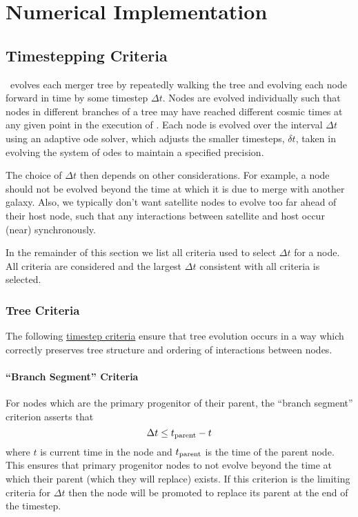 \chapter{Numerical Implementation}

\section{Timestepping Criteria}\label{sec:TimesteppingCriteria}

\glc\ evolves each merger tree by repeatedly walking the tree and evolving each node forward in time by some timestep $\Delta t$. Nodes are evolved individually such that nodes in different branches of a tree may have reached different cosmic times at any given point in the execution of \glc. Each node is evolved over the interval $\Delta t$ using an adaptive \gls{ode} solver, which adjusts the smaller timesteps, $\delta t$, taken in evolving the system of \glspl{ode} to maintain a specified precision.

The choice of $\Delta t$ then depends on other considerations. For example, a node should not be evolved beyond the time at which it is due to merge with another galaxy. Also, we typically don't want satellite nodes to evolve too far ahead of their host node, such that any interactions between satellite and host occur (near) synchronously.

In the remainder of this section we list all criteria used to select $\Delta t$ for a node. All criteria are considered and the largest $\Delta t$ consistent with all criteria is selected.

\subsection{Tree Criteria}

The following \hyperlink{merger_trees.evolve.F90:merger_trees_evolve:evolve_to_time}{timestep criteria} ensure that tree evolution occurs in a way which correctly preserves tree structure and ordering of interactions between \glspl{node}.

\subsubsection{``Branch Segment'' Criteria}

For \glspl{node} which are the \gls{primary progenitor} of their \gls{parent}, the ``branch segment'' criterion asserts that
\begin{equation}
 \Delta t \le t_{\rm parent} - t
\end{equation}
where $t$ is current time in the \gls{node} and $t_{\rm parent}$ is the time of the \gls{parent} \gls{node}. This ensures that \gls{primary progenitor} \glspl{node} to not evolve beyond the time at which their \gls{parent} (which they will replace) exists.  If this criterion is the limiting criteria for $\Delta t$ then the \gls{node} will be promoted to replace its \gls{parent} at the end of the timestep. 

